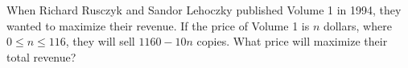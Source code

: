 When Richard Rusczyk and Sandor Lehoczky published Volume 1 in 1994, they wanted to maximize their revenue. If the price of Volume 1 is $n$ dollars, where $0\le n\le116$, they will sell $1160-10n$ copies. What price will maximize their total revenue?
